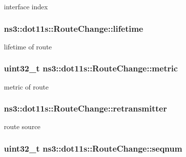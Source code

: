 interface index 

\subsubsection[{\texorpdfstring{lifetime}{lifetime}}]{ ns3\+::dot11s\+::\+Route\+Change\+::lifetime}\hypertarget{structns3_1_1dot11s_1_1RouteChange_a1048103d6ec996f62e007242a925a2e4}{}\label{structns3_1_1dot11s_1_1RouteChange_a1048103d6ec996f62e007242a925a2e4}


lifetime of route 

\subsubsection[{\texorpdfstring{metric}{metric}}]{\setlength{\rightskip}{0pt plus 5cm}uint32\+\_\+t ns3\+::dot11s\+::\+Route\+Change\+::metric}\hypertarget{structns3_1_1dot11s_1_1RouteChange_a9be2c3c4e622c4dbee4d0c0f4342c550}{}\label{structns3_1_1dot11s_1_1RouteChange_a9be2c3c4e622c4dbee4d0c0f4342c550}


metric of route 

\subsubsection[{\texorpdfstring{retransmitter}{retransmitter}}]{ ns3\+::dot11s\+::\+Route\+Change\+::retransmitter}\hypertarget{structns3_1_1dot11s_1_1RouteChange_a23ef9fccd945f9c91c0cf9c21133a71c}{}\label{structns3_1_1dot11s_1_1RouteChange_a23ef9fccd945f9c91c0cf9c21133a71c}


route source 

\subsubsection[{\texorpdfstring{seqnum}{seqnum}}]{\setlength{\rightskip}{0pt plus 5cm}uint32\+\_\+t ns3\+::dot11s\+::\+Route\+Change\+::seqnum}\hypertarget{structns3_1_1dot11s_1_1RouteChange_a72a97cf7f4be4037eaf0773c9d514f3e}{}\label{structns3_1_1dot11s_1_1RouteChange_a72a97cf7f4be4037eaf0773c9d514f3e}


